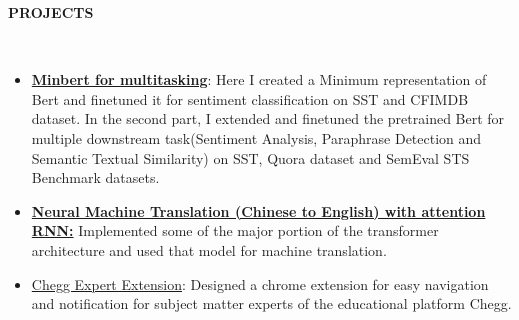 \documentclass[a4paper,10pt]{article}
\newcommand{\lsep}{-0.5cm}
\newcommand{\resheading}[1]{{\small \colorbox{mygrey}{\begin{minipage}{0.975\textwidth}{\textbf{#1 \vphantom{p\^{E}}}}\end{minipage}}}}
\begin{document}
\resheading{\textbf{PROJECTS} }\\[\lsep]
\begin{itemize}
\setlength\itemsep{0.2em}
\item \href{https://github.com/soumitrapy/minbert-default-final-project}{\textbf{Minbert for multitasking}}: Here I created a Minimum representation of Bert and finetuned it for sentiment classification on SST and CFIMDB dataset. In the second part, I extended and finetuned the pretrained Bert for multiple downstream task(Sentiment Analysis, Paraphrase Detection and Semantic Textual Similarity) on  SST, Quora dataset and SemEval STS Benchmark datasets.
\item \href{https://github.com/soumitrapy/cs224n/tree/main/a4/student}{\textbf{Neural Machine Translation (Chinese to English) with attention RNN:}} Implemented some of the major portion of the transformer architecture and used that model for machine translation. 
\item \href{https://github.com/soumitrapy/CheggExtension}{Chegg Expert Extension}: Designed a chrome extension for easy navigation and notification for subject matter experts of the educational platform Chegg.

\end{itemize}
\end{document}
